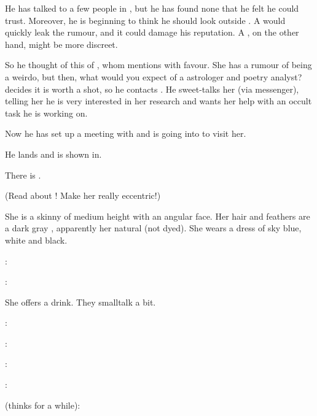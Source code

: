 He has talked to a few people in \CiriathSepher, but he has found none that he felt he could trust. 
Moreover, he is beginning to think he should look outside \CiriathSepher. 
A \CiriathSepher would quickly leak the rumour, and it could damage his reputation. 
A \TiphredSerah, on the other hand, might be more discreet. 

So he thought of this \Urizeth of \TiphredSerah, whom \Lothagiel mentions with favour. 
She has a rumour of being a weirdo, but then, what would you expect of a \TiphredSerah astrologer and poetry analyst? 
\Teshrial decides it is worth a shot, so he contacts \Urizeth. 
He sweet-talks her (via messenger), telling her he is very interested in her research and wants her help with an occult task he is working on. 

Now he has set up a meeting with \Urizeth and is going into \TiphredSerah to visit her. 

\begin{comment}
  \section{Teshrial meets Urizeth}
\end{comment}

He lands and is shown in. 

There is \Urizeth. 

(Read about \Urizeth! Make her really eccentric!)

She is a skinny \resvil of medium height with an angular face. 
Her hair and feathers are a dark gray \colour, apparently her natural \colour (not dyed). 
She wears a dress of sky blue, white and black. 

\Urizeth: 

\Teshrial: 

She offers a drink. 
They smalltalk a bit. 

\Urizeth: 

\Teshrial: 

\Urizeth: 

\Teshrial: 

\Urizeth (thinks for a while): 

